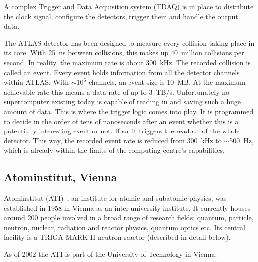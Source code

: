 \documentclass[twoside,12pt]{packages/mytustyle}  %
\begin{document}
A complex Trigger and Data Acquisition system (TDAQ) is in place to distribute the clock signal, configure the detectors, trigger them and handle the output data.

The ATLAS detector has been designed to measure every collision taking place in its core. With 25~ns between collisions, this makes up 40~million collisions per second. In reality, the maximum rate is about 300~kHz. The recorded collision is called an event. Every event holds information from all the detector channels within ATLAS. With $\sim$$10^6$ channels, an event size is 10~MB. At the maximum achievable rate this means a data rate of up to 3~TB/s. Unfortunately no supercomputer existing today is capable of reading in and saving such a huge amount of data. This is where the trigger logic comes into play. It is programmed to decide in the order of tens of nanoseconds after an event whether this is a potentially interesting event or not. If so, it triggers the readout of the whole detector. This way, the recorded event rate is reduced from 300~kHz to $\sim$500~Hz, which is already within the limits of the computing centre's capabilities.


\subsection{Atominstitut, Vienna}
Atominstitut (ATI)~\cite{AtomInst:00000}, an institute for atomic and subatomic physics, was established in 1958 in Vienna as an inter-university institute. It currently houses around 200 people involved in a broad range of research fields: quantum, particle, neutron, nuclear, radiation and reactor physics, quantum optics etc. Its central facility is a TRIGA MARK II neutron reactor (described in detail below). 

As of 2002 the ATI is part of the University of Technology in Vienna.
\end{document}
